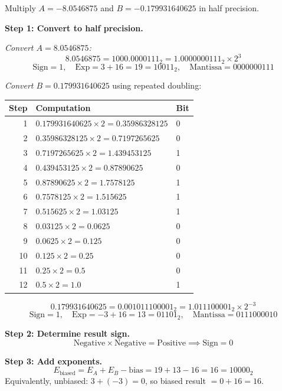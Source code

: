 Multiply $A = -8.0546875$ and $B = -0.179931640625$ in half precision.

\noindent\textbf{Step 1: Convert to half precision.}

\medskip\noindent\emph{Convert $A = 8.0546875$:}
\[
  8.0546875 = 1000.0000111_2 = 1.0000000111_2 \times 2^3
\]
\[
  \text{Sign} = 1,\quad
  \text{Exp} = 3 + 16 = 19 = 10011_2,\quad
  \text{Mantissa} = 0000000111
\]

\medskip\noindent\emph{Convert $B = 0.179931640625$} using repeated doubling:

\begin{center}
\begin{tabular}{rll}
\toprule
\textbf{Step} & \textbf{Computation} & \textbf{Bit} \\
\midrule
1  & $0.179931640625 \times 2 = 0.35986328125$  & 0 \\
2  & $0.35986328125  \times 2 = 0.7197265625$   & 0 \\
3  & $0.7197265625   \times 2 = 1.439453125$    & 1 \\
4  & $0.439453125    \times 2 = 0.87890625$     & 0 \\
5  & $0.87890625     \times 2 = 1.7578125$      & 1 \\
6  & $0.7578125      \times 2 = 1.515625$       & 1 \\
7  & $0.515625       \times 2 = 1.03125$        & 1 \\
8  & $0.03125        \times 2 = 0.0625$         & 0 \\
9  & $0.0625         \times 2 = 0.125$          & 0 \\
10 & $0.125          \times 2 = 0.25$           & 0 \\
11 & $0.25           \times 2 = 0.5$            & 0 \\
12 & $0.5            \times 2 = 1.0$            & 1 \\
\bottomrule
\end{tabular}
\end{center}

\[
  0.179931640625 = 0.001011100001_2 = 1.011100001_2 \times 2^{-3}
\]
\[
  \text{Sign} = 1,\quad
  \text{Exp} = -3 + 16 = 13 = 01101_2,\quad
  \text{Mantissa} = 0111000010
\]

\noindent\textbf{Step 2: Determine result sign.}
\[
  \text{Negative} \times \text{Negative} = \text{Positive} \implies \text{Sign} = 0
\]

\noindent\textbf{Step 3: Add exponents.}
\[
  E_{\text{biased}} = E_A + E_B - \text{bias} = 19 + 13 - 16 = 16 = 10000_2
\]
Equivalently, unbiased: $3 + (-3) = 0$, so biased result $= 0 + 16 = 16$.

